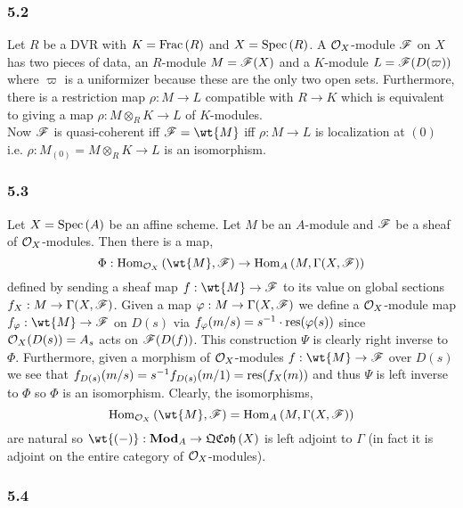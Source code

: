 \documentclass[12pt]{article}
\begin{document}
\subsubsection{5.2}

Let $R$ be a DVR with $K = \mathrm{Frac}\left(R\right)$ and $X = \mathrm{Spec}\left( R \right)$. A $\mathcal{O}_{X}$-module $\mathscr{F}$ on $X$ has two pieces of data, an $R$-module $M = \mathscr{F}(X)$ and a $K$-module $L = \mathscr{F}(D(\varpi))$ where $\varpi$ is a uniformizer because these are the only two open sets. Furthermore, there is a restriction map $\rho : M \to L$ compatible with $R \to K$ which is equivalent to giving a map $\rho : M \otimes_R K \to L$ of $K$-modules.
\bigskip\\
Now $\mathscr{F}$ is quasi-coherent iff $\F = \wt{M}$ iff $\rho : M \to L$ is localization at $(0)$ i.e. $\rho : M_{(0)} = M \otimes_R K \to L$ is an isomorphism. 

\subsubsection{5.3}

Let $X = \mathrm{Spec}\left( A \right)$ be an affine scheme. Let $M$ be an $A$-module and $\mathscr{F}$ be a sheaf of $\mathcal{O}_{X}$-modules. Then there is a map,
\[ \Phi : \Hom{\struct{X}}{\wt{M}}{\F} \to \Hom{A}{M}{\Gamma(X, \F)} \]
defined by sending a sheaf map $f : \wt{M} \to \F$ to its value on global sections $f_X : M \to \Gamma(X, \mathscr{F})$. Given a map $\varphi : M \to \Gamma(X, \mathscr{F})$ we define a $\mathcal{O}_{X}$-module map $f_\varphi : \wt{M} \to \F$ on $D(s)$ via $f_{\varphi}(m/s) = s^{-1} \cdot \mathrm{res}(\varphi(s))$ since $\mathcal{O}_{X}(D(s)) = A_s$ acts on $\mathscr{F}(D(f))$. This construction $\Psi$ is clearly right inverse to $\Phi$. Furthermore, given a morphism of $\mathcal{O}_{X}$-modules $f : \wt{M} \to \F$ over $D(s)$ we see that $f_{D(s)}(m/s) = s^{-1} f_{D(s)}(m/1) = \mathrm{res}(f_X(m))$ and thus $\Psi$ is left inverse to $\Phi$ so $\Phi$ is an isomorphism. Clearly, the isomorphisms,
\[ \Hom{\struct{X}}{\wt{M}}{\F} = \Hom{A}{M}{\Gamma(X, \F)} \]
are natural so $\wt{(-)} : \Mod{A} \to \QCoh{X}$ is left adjoint to $\Gamma$ (in fact it is adjoint on the entire category of $\mathcal{O}_{X}$-modules).

\subsubsection{5.4}
\end{document}
